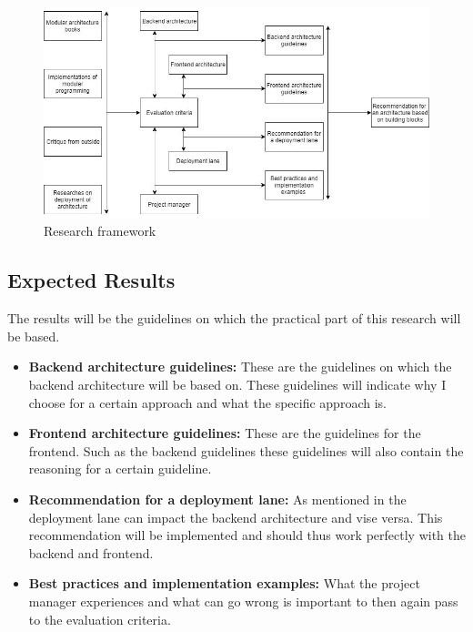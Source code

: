 \begin{figure}[H]
	\includegraphics[width=\linewidth]{research_framework.png}
	\caption{Research framework}
\end{figure}

\subsection{Expected Results}

The results will be the guidelines on which the practical part of this research will be based.

\begin{itemize}
	\item \textbf{Backend architecture guidelines: } These are the guidelines on which the backend architecture will be based on. These guidelines will indicate why I choose for a certain approach and what the specific approach is.

	\item \textbf{Frontend architecture guidelines: } These are the guidelines for the frontend. Such as the backend guidelines these guidelines will also contain the reasoning for a certain guideline.

	\item \textbf{Recommendation for a deployment lane: } As mentioned in  the deployment lane can impact the backend architecture and vise versa. This recommendation will be implemented and should thus work perfectly with the backend and frontend.

	\item \textbf{Best practices and implementation examples: } What the project manager experiences and what can go wrong is important to then again pass to the evaluation criteria.
\end{itemize}

